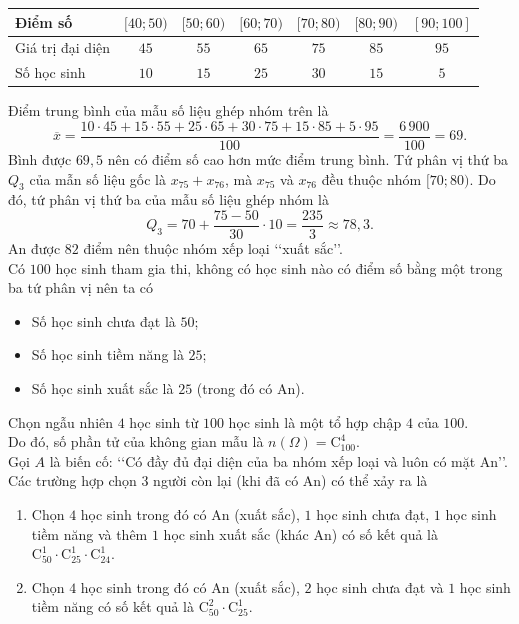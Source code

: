 \begin{ex}
{\begin{itemchoice}
			\begin{center}
				\begin{tabular}{|l|c|c|c|c|c|c|}
					\hline
					Điểm số & $[40; 50)$ & $[50; 60)$ & $[60; 70)$ & $[70; 80)$ & $[80; 90)$ & $[90; 100]$ \\ \hline
					Giá trị đại diện & $45$ & $55$ & $65$ & $75$ & $85$ & $95$ \\ \hline
					Số học sinh & $10$ & $15$ & $25$ & $30$ & $15$ & $5$ \\ \hline
				\end{tabular}
			\end{center}
			Điểm trung bình của mẫu số liệu ghép nhóm trên là 
			\[\overline{x} = \dfrac{10\cdot 45 + 15\cdot 55 + 25\cdot 65 + 30\cdot 75 + 15\cdot 85 + 5\cdot 95}{100} = \dfrac{6\,900}{100} = 69.\]
			Bình được $69{,}5$ nên có điểm số cao hơn mức điểm trung bình.
			\itemch Tứ phân vị thứ ba $Q_3$ của mẫn số liệu gốc là $x_{75} + x_{76}$, mà $x_{75}$ và $x_{76}$ đều thuộc nhóm $[70; 80)$. Do đó, tứ phân vị thứ ba của mẫu số liệu ghép nhóm là
			\[Q_3 = 70 + \dfrac{75 - 50}{30} \cdot 10=\dfrac{235}{3}\approx78{,}3.\]
			An được $82$ điểm nên thuộc nhóm xếp loại \lq\lq xuất sắc\rq\rq.\\
			Có $100$ học sinh tham gia thi, không có học sinh nào có điểm số bằng một trong ba tứ phân vị nên ta có
			\begin{itemize}
				\item Số học sinh chưa đạt là $50$;
				\item Số học sinh tiềm năng là $25$;
				\item Số học sinh xuất sắc là $25$ (trong đó có An).
			\end{itemize}
			Chọn ngẫu nhiên $4$ học sinh từ $100$ học sinh là một tổ hợp chập $4$ của $100$. \\
			Do đó, số phần tử của không gian mẫu là $n(\Omega)=\mathrm{C}_{100}^4$.\\
			Gọi $A$ là biến cố: \lq\lq Có đầy đủ đại diện của ba nhóm xếp loại và luôn có mặt An\rq\rq.\\ 
			Các trường hợp chọn $3$ người còn lại (khi đã có An) có thể xảy ra là
			\begin{enumerate}[\it TH 1:]
				\item Chọn $4$ học sinh trong đó có An (xuất sắc), $1$ học sinh chưa đạt, $1$ học sinh tiềm năng và thêm $1$ học sinh xuất sắc (khác An) có số kết quả là $\mathrm{C}_{50}^1 \cdot \mathrm{C}_{25}^1 \cdot \mathrm{C}_{24}^1$.
				\item Chọn $4$ học sinh trong đó có An (xuất sắc), $2$ học sinh chưa đạt và $1$ học sinh tiềm năng có số kết quả là $\mathrm{C}_{50}^2 \cdot \mathrm{C}_{25}^1$.

\end{enumerate}
\end{itemchoice}}
\end{ex}

